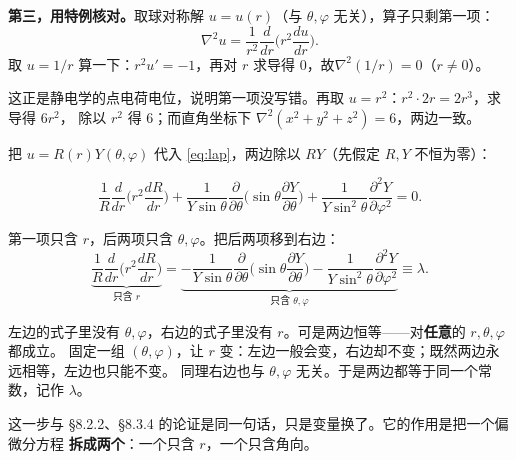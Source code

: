 \textbf{第三，用特例核对。}取球对称解 $u=u(r)$（与 $\theta,\varphi$ 无关），算子只剩第一项：
\[
\nabla^2u=\frac{1}{r^2}\frac{d}{dr}\Big(r^2\frac{du}{dr}\Big).
\]
取 $u=1/r$ 算一下：$r^2u'=-1$，再对 $r$ 求导得 $0$，故\allowbreak $\nabla^2(1/r)=0$（$r\ne0$）。

这正是静电学的点电荷电位，说明第一项没写错。再取 $u=r^2$：$r^2\cdot2r=2r^3$，求导得 $6r^2$，
除以 $r^2$ 得 $6$；而直角坐标下 $\nabla^2(x^2+y^2+z^2)=6$，两边一致。


\label{sec:s2}


把 $u=R(r)Y(\theta,\varphi)$ 代入 \eqref{eq:lap}，两边除以 $RY$（先假定 $R,Y$ 不恒为零）：

\[
\frac{1}{R}\frac{d}{dr}\Big(r^2\frac{dR}{dr}\Big)
+\frac{1}{Y\sin\theta}\frac{\partial}{\partial\theta}\Big(\sin\theta\frac{\partial Y}{\partial\theta}\Big)
+\frac{1}{Y\sin^2\theta}\frac{\partial^2Y}{\partial\varphi^2}=0.
\]

第一项只含 $r$，后两项只含 $\theta,\varphi$。把后两项移到右边：
\begin{equation}
\underbrace{\frac{1}{R}\frac{d}{dr}\Big(r^2\frac{dR}{dr}\Big)}_{\text{只含 }r}
=\underbrace{-\frac{1}{Y\sin\theta}\frac{\partial}{\partial\theta}\Big(\sin\theta\frac{\partial Y}{\partial\theta}\Big)
-\frac{1}{Y\sin^2\theta}\frac{\partial^2Y}{\partial\varphi^2}}_{\text{只含 }\theta,\varphi}
\equiv\lambda .
\label{eq:sep1}
\end{equation}


左边的式子里没有 $\theta,\varphi$，右边的式子里没有 $r$。可是两边恒等——对\textbf{任意}的 $r,\theta,\varphi$ 都成立。
固定一组 $(\theta,\varphi)$，让 $r$ 变：左边一般会变，右边却不变；既然两边永远相等，左边也只能不变。
同理右边也与 $\theta,\varphi$ 无关。于是两边都等于同一个常数，记作 $\lambda$。

这一步与 §8.2.2、§8.3.4 的论证是同一句话，只是变量换了。它的作用是把一个偏微分方程
\textbf{拆成两个}：一个只含 $r$，一个只含角向。

